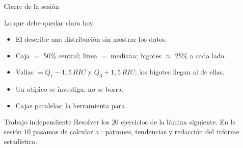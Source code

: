 \documentclass[aspectratio=169,10pt]{beamer}
\begin{document}
\begin{frame}{Cierre de la sesión}
  \begin{block}{Lo que debe quedar claro hoy}
    \scriptsize
    \begin{itemize}\setlength{\itemsep}{0.02cm}
      \item El  describe una distribución sin
            mostrar los datos.
      \item Caja $=$ 50\% central; línea $=$ mediana; bigotes $\approx$
            25\% a cada lado.
      \item Vallas $= Q_1 - 1{,}5\,RIC$ y $Q_3 + 1{,}5\,RIC$; los bigotes
            llegan al  de ellas.
      \item Un atípico se investiga, no se borra.
      \item Cajas paralelas: la herramienta para .
    \end{itemize}
  \end{block}

  \vspace{0.1cm}
  \begin{alertblock}{Trabajo independiente}
    \scriptsize
    Resolver los 20 ejercicios de la lámina siguiente. En la sesión 10 pasamos
    de calcular a : patrones, tendencias y redacción del
    informe estadístico.
  \end{alertblock}
\end{frame}
\end{document}
